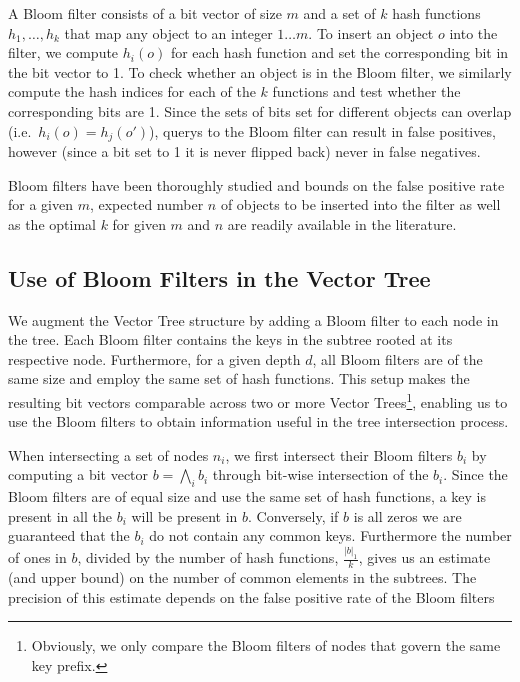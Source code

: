 \documentclass[11pt,letterpaper]{article}
\begin{document}
A Bloom filter consists of a bit vector of size $m$ and a set of $k$
hash functions $h_1, \ldots, h_k$ that map any object to an integer $1
\ldots m$. To insert an object $o$ into the filter, we compute
$h_i(o)$ for each hash function and set the corresponding bit in the
bit vector to 1. To check whether an object is in the Bloom filter, we
similarly compute the hash indices for each of the $k$ functions and
test whether the corresponding bits are 1. Since the sets of bits set
for different objects can overlap (i.e.\ $h_i(o) = h_j(o')$), querys
to the Bloom filter can result in false positives, however (since a
bit set to 1 it is never flipped back) never in false negatives. 

Bloom filters have been thoroughly studied and bounds on the false
positive rate for a given $m$, expected number $n$ of objects to be
inserted into the filter as well as the optimal $k$ for given $m$ and
$n$ are readily available in the literature.

\subsection{Use of Bloom Filters in the Vector Tree}

We augment the Vector Tree structure by adding a Bloom filter to each
node in the tree. Each Bloom filter contains the keys in the subtree
rooted at its respective node. Furthermore, for a given depth $d$, all
Bloom filters are of the same size and employ the same set of hash
functions. This setup makes the resulting bit vectors comparable
across two or more Vector Trees\footnote{Obviously, we only compare
  the Bloom filters of nodes that govern the same key prefix.},
enabling us to use the Bloom filters to obtain information useful in
the tree intersection process.

When intersecting a set of nodes $n_i$, we first intersect their Bloom
filters $b_i$ by computing a bit vector $b = \bigwedge_i b_i$ through
bit-wise intersection of the $b_i$. Since the Bloom filters are of
equal size and use the same set of hash functions, a key is present in
all the $b_i$ will be present in $b$. Conversely, if $b$ is all zeros
we are guaranteed that the $b_i$ do not contain any common
keys. Furthermore the number of ones in $b$, divided by the number of
hash functions, $\frac{|b|_1}{k}$, gives us an estimate (and upper
bound) on the number of common elements in the subtrees. The precision
of this estimate depends on the false positive rate of the Bloom
filters
\end{document}
